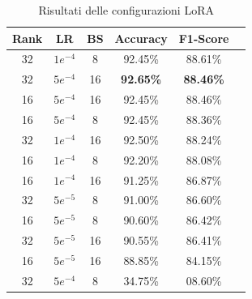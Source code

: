 \documentclass[a4paper,12pt]{article}
\begin{document}
\begin{table}[H]
    \centering
    \small
    \begin{tabular}{|c|c|c|c|c|l|}
        \hline
        \textbf{Rank} & \textbf{LR} & \textbf{BS} & \textbf{Accuracy} & \textbf{F1-Score} \\
        \hline
        32            & $1e^{-4}$   & 8           & 92.45\%           & 88.61\%           \\
        32            & $5e^{-4}$   & 16          & \textbf{92.65\%}  & \textbf{88.46\%}  \\
        16            & $5e^{-4}$   & 16          & 92.45\%           & 88.46\%           \\
        16            & $5e^{-4}$   & 8           & 92.45\%           & 88.36\%           \\
        32            & $1e^{-4}$   & 16          & 92.50\%           & 88.24\%           \\
        16            & $1e^{-4}$   & 8           & 92.20\%           & 88.08\%           \\
        16            & $1e^{-4}$   & 16          & 91.25\%           & 86.87\%           \\
        32            & $5e^{-5}$   & 8           & 91.00\%           & 86.60\%           \\
        16            & $5e^{-5}$   & 8           & 90.60\%           & 86.42\%           \\
        32            & $5e^{-5}$   & 16          & 90.55\%           & 86.41\%           \\
        16            & $5e^{-5}$   & 16          & 88.85\%           & 84.15\%           \\
        32            & $5e^{-4}$   & 8           & 34.75\%           & 08.60\%           \\
        \hline
    \end{tabular}
    \caption{Risultati delle configurazioni LoRA}
\end{table}
\end{document}
